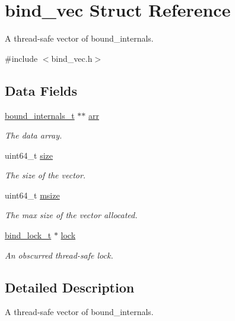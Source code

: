 \hypertarget{structbind__vec}{}\section{bind\+\_\+vec Struct Reference}
\label{structbind__vec}


A thread-\/safe vector of bound\+\_\+internals.  




{\ttfamily \#include $<$bind\+\_\+vec.\+h$>$}

\subsection*{Data Fields}
\begin{DoxyCompactItemize}
\item 
\hyperlink{structbound__internals__t}{bound\+\_\+internals\+\_\+t} $\ast$$\ast$ \hyperlink{structbind__vec_a8bf39e88ad9a1715c7e6cfa4fa8028f4}{arr}
\begin{DoxyCompactList}\small\item\em The data array. \end{DoxyCompactList}\item 
uint64\+\_\+t \hyperlink{structbind__vec_a322fa9fd253719971508bf013a668a64}{size}
\begin{DoxyCompactList}\small\item\em The size of the vector. \end{DoxyCompactList}\item 
uint64\+\_\+t \hyperlink{structbind__vec_aa45fa0f2e32261123f693541f26fc12b}{msize}
\begin{DoxyCompactList}\small\item\em The max size of the vector allocated. \end{DoxyCompactList}\item 
\hyperlink{structbind__lock__t}{bind\+\_\+lock\+\_\+t} $\ast$ \hyperlink{structbind__vec_af6053d8f0d9be5d8b03ffbc06f30c0a5}{lock}
\begin{DoxyCompactList}\small\item\em An obscurred thread-\/safe lock. \end{DoxyCompactList}\end{DoxyCompactItemize}


\subsection{Detailed Description}
A thread-\/safe vector of bound\+\_\+internals. 

